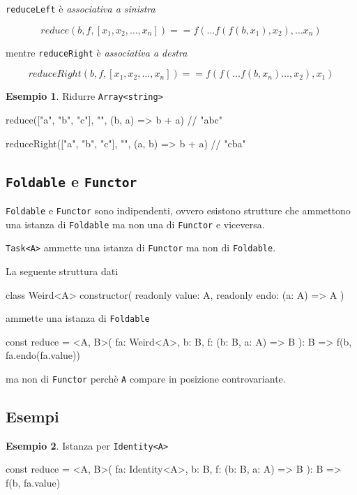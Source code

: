 \documentclass[12pt]{article}
\theoremstyle{definition}
\newtheorem{example}{Esempio}[section]
\newenvironment{code}
  {\vspace{0.5cm} \VerbatimEnvironment\begin{typescriptcode}}
  {\end{typescriptcode} \vspace{0.2cm}}
\begin{document}
\texttt{reduceLeft} è \emph{associativa a sinistra}

$$
reduce(b, f, [x_1, x_2, \ldots , x_n])  == f( \ldots f(f(b, x_1), x_2), \ldots x_n)
$$

mentre \texttt{reduceRight} è \emph{associativa a destra}

$$
reduceRight(b, f, [x_1, x_2, \ldots , x_n])  == f(f( \ldots f(b, x_n) \ldots , x_2), x_1)
$$

\begin{example}
Ridurre \texttt{Array<string>}

\begin{code}
reduce(["a", "b", "c"], "", (b, a) => b + a) // "abc"

reduceRight(["a", "b", "c"], "", (a, b) => b + a) // "cba"
\end{code}
\end{example}

\subsection{\texttt{Foldable} e \texttt{Functor}}

\texttt{Foldable} e \texttt{Functor} sono indipendenti, ovvero esistono strutture che ammettono una istanza di \texttt{Foldable} ma non una di
\texttt{Functor} e viceversa.

\texttt{Task<A>} ammette una istanza di \texttt{Functor} ma non di \texttt{Foldable}.

La seguente struttura dati

\begin{code}
class Weird<A> {
  constructor(
    readonly value: A,
    readonly endo: (a: A) => A
  ) {}
}
\end{code}

ammette una istanza di \texttt{Foldable}

\begin{code}
const reduce = <A, B>(
  fa: Weird<A>,
  b: B,
  f: (b: B, a: A) => B
): B => f(b, fa.endo(fa.value))
\end{code}

ma non di \texttt{Functor} perchè \texttt{A} compare in posizione controvariante.

\subsection{Esempi}

\begin{example}
Istanza per \texttt{Identity<A>}

\begin{code}
const reduce = <A, B>(
  fa: Identity<A>,
  b: B,
  f: (b: B, a: A) => B
): B => f(b, fa.value)
\end{code}
\end{example}
\end{document}
